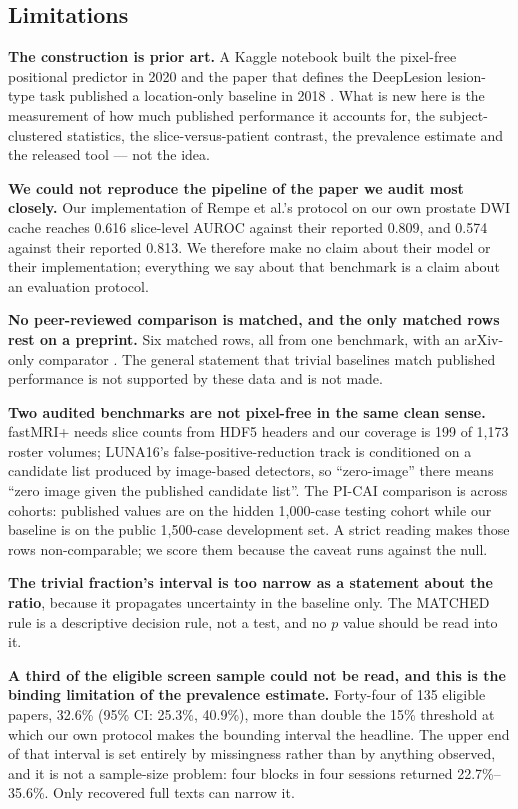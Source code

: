 \documentclass[11pt,a4paper]{article}
\begin{document}
\subsection{Limitations}

\textbf{The construction is prior art.} A Kaggle notebook built the pixel-free
positional predictor in 2020 \citep{osciiart2020baseline} and the paper that defines the
DeepLesion lesion-type task published a location-only baseline in 2018
\citep{yan2018deeplesiongraphs}. What is new
here is the measurement of how much published performance it accounts for, the
subject-clustered statistics, the slice-versus-patient contrast, the prevalence
estimate and the released tool --- not the idea.

\textbf{We could not reproduce the pipeline of the paper we audit most closely.}
Our implementation of Rempe et al.'s protocol on our own prostate DWI cache
reaches 0.616 slice-level AUROC against their reported 0.809, and 0.574 against
their reported 0.813. We therefore make no claim about their model or their
implementation; everything we say about that benchmark is a claim about an
evaluation protocol.

\textbf{No peer-reviewed comparison is matched, and the only matched rows rest on
a preprint.} Six matched rows, all from one benchmark, with an arXiv-only
comparator \citep{rempe2024kspace}. The general statement that trivial baselines match
published performance is not supported by these data and is not made.

\textbf{Two audited benchmarks are not pixel-free in the same clean sense.}
fastMRI+ needs slice counts from HDF5 headers and our coverage is 199 of 1,173
roster volumes; LUNA16's false-positive-reduction track is conditioned on a
candidate list produced by image-based detectors, so ``zero-image'' there means
``zero image given the published candidate list''. The PI-CAI comparison is
across cohorts: published values are on the hidden 1,000-case testing cohort
while our baseline is on the public 1,500-case development set. A strict reading
makes those rows non-comparable; we score them because the caveat runs against
the null.

\textbf{The trivial fraction's interval is too narrow as a statement about the
ratio}, because it propagates uncertainty in the baseline only. The MATCHED rule
is a descriptive decision rule, not a test, and no $p$ value should be read into
it.

\textbf{A third of the eligible screen sample could not be read, and this is the
binding limitation of the prevalence estimate.} Forty-four of 135 eligible
papers, 32.6\% (95\% CI: 25.3\%, 40.9\%), more than double the 15\% threshold at
which our own protocol makes the bounding interval the headline. The upper end of
that interval is set entirely by missingness rather than by anything observed,
and it is not a sample-size problem: four blocks in four sessions returned
22.7\%--35.6\%. Only recovered full texts can narrow it.
\end{document}
